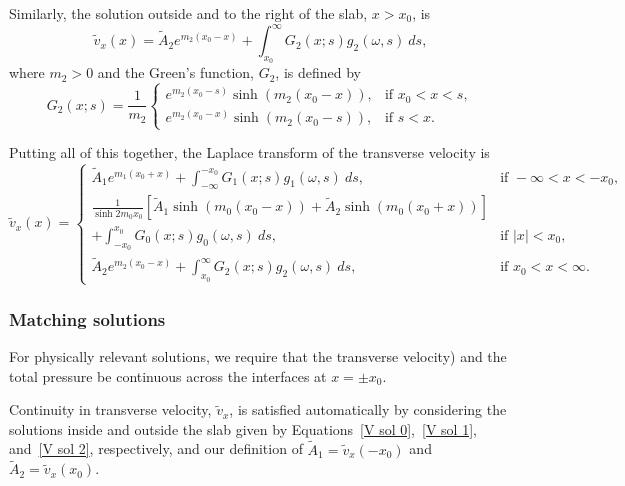 \documentclass[12pt]{../style-files/ociamthesis}
\begin{document}
Similarly, the solution outside and to the right of the slab, $x > x_0$, is
\begin{equation}
\tilde{v}_x(x) = \tilde{A}_2e^{m_2(x_0-x)} + \int_{x_0}^{\infty} G_2(x; s) g_2(\omega, s) ~ds,
\label{P sol 2}
\end{equation}
where $m_2 > 0$ and the Green's function, $G_2$, is defined by
\begin{equation}
G_2(x; s) = \frac{1}{m_2}
\begin{cases}
e^{m_2(x_0 - s)}\sinh(m_2(x_0 - x)), & \text{if } x_0 < x < s, \\
e^{m_2(x_0 - x)}\sinh(m_2(x_0 - s)), & \text{if } s < x.
\end{cases}
\end{equation}

Putting all of this together, the Laplace transform of the transverse velocity is
\begin{equation}
\tilde{v}_x(x) = 
\begin{cases}
\tilde{A}_1e^{m_1(x_0 + x)} + \int_{-\infty}^{-x_0} G_1(x; s) g_1(\omega, s) ~ds, & \text{if } -\infty < x < -x_0, \\

\frac{1}{\sinh{2m_0x_0}} \left[ \tilde{A}_1\sinh(m_0(x_0 - x)) + \tilde{A}_2\sinh(m_0(x_0 + x)) \right]  \\
+ \int_{-x_0}^{x_0} G_0(x; s) g_0(\omega, s) ~ds, & \text{if } |x| < x_0, \\

\tilde{A}_2e^{m_2(x_0 - x)} + \int_{x_0}^{\infty} G_2(x; s) g_2(\omega, s) ~ds, & \text{if } x_0 < x < \infty.
\end{cases}
\label{V sol}
\end{equation}


\subsubsection{Matching solutions}

For physically relevant solutions, we require that the transverse velocity) and the total pressure be continuous across the interfaces at $x = \pm x_0$.

Continuity in transverse velocity, $\tilde{v}_x$, is satisfied automatically by considering the solutions inside and outside the slab given by Equations~\eqref{V sol 0},~\eqref{V sol 1}, and~\eqref{V sol 2}, respectively, and our definition of $\tilde{A}_1 = \tilde{v}_x(-x_0)$ and $\tilde{A}_2 = \tilde{v}_x(x_0)$.
\end{document}
